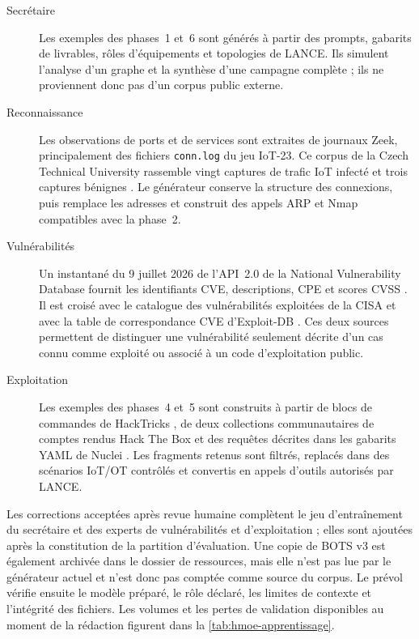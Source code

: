 \begin{description}
  \item[Secrétaire] Les exemples des phases~1 et~6 sont générés à partir des
    prompts, gabarits de livrables, rôles d'équipements et topologies de LANCE.
    Ils simulent l'analyse d'un graphe et la synthèse d'une campagne complète ;
    ils ne proviennent donc pas d'un corpus public externe.

  \item[Reconnaissance] Les observations de ports et de services sont extraites
    de journaux Zeek, principalement des fichiers \texttt{\footnotesize conn.log} du jeu
    IoT-23. Ce corpus de la Czech Technical University rassemble vingt captures
    de trafic IoT infecté et trois captures bénignes \cite{garcia2020iot23}. Le
    générateur conserve la structure des connexions, puis remplace les adresses
    et construit des appels ARP et Nmap compatibles avec la phase~2.

  \item[Vulnérabilités] Un instantané du 9 juillet 2026 de l'API~2.0 de la
    National Vulnerability Database fournit les identifiants CVE, descriptions,
    CPE et scores CVSS \cite{nistnvdapi}. Il est croisé avec le catalogue des
    vulnérabilités exploitées de la CISA \cite{cisakev} et avec la table de
    correspondance CVE d'Exploit-DB \cite{offsecexploitdb}. Ces deux sources
    permettent de distinguer une vulnérabilité seulement décrite d'un cas connu
    comme exploité ou associé à un code d'exploitation public.

  \item[Exploitation] Les exemples des phases~4 et~5 sont construits à partir de
    blocs de commandes de HackTricks \cite{hacktricksrepo}, de deux collections
    communautaires de comptes rendus Hack The Box
    \cite{momenbaselhtb,zweilosechtb} et des requêtes décrites dans les gabarits
    YAML de Nuclei \cite{nucleitemplates}. Les fragments retenus sont filtrés,
    replacés dans des scénarios IoT/OT contrôlés et convertis en appels d'outils
    autorisés par LANCE.
\end{description}

Les corrections acceptées après revue humaine complètent le jeu d'entraînement
du secrétaire et des experts de vulnérabilités et d'exploitation ; elles sont
ajoutées après la constitution de la partition d'évaluation. Une copie de BOTS
v3 est également archivée dans le dossier de ressources, mais elle n'est pas
lue par le générateur actuel et n'est donc pas comptée comme source du corpus.
Le prévol vérifie ensuite le modèle préparé, le rôle déclaré, les limites de
contexte et l'intégrité des fichiers. Les volumes et les pertes de validation
disponibles au moment de la rédaction figurent dans la
\cref{tab:hmoe-apprentissage}.

